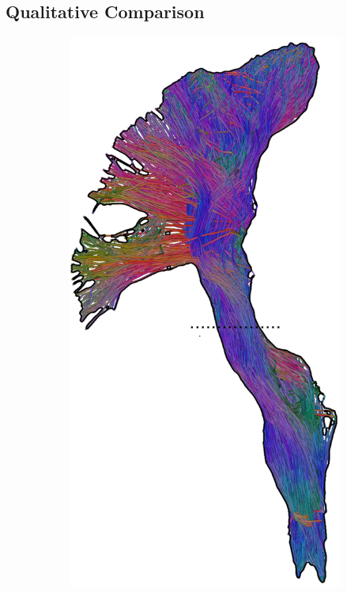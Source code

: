 \subsection{Qualitative Comparison}
\begin{figure}[t]
	\centering
	\begin{minipage}{0.19\linewidth}
\begin{subfigure}[b]{\linewidth}
		\includegraphics[width=\linewidth]{cst-ref-c}

\end{subfigure}
\end{minipage}
\end{figure}
